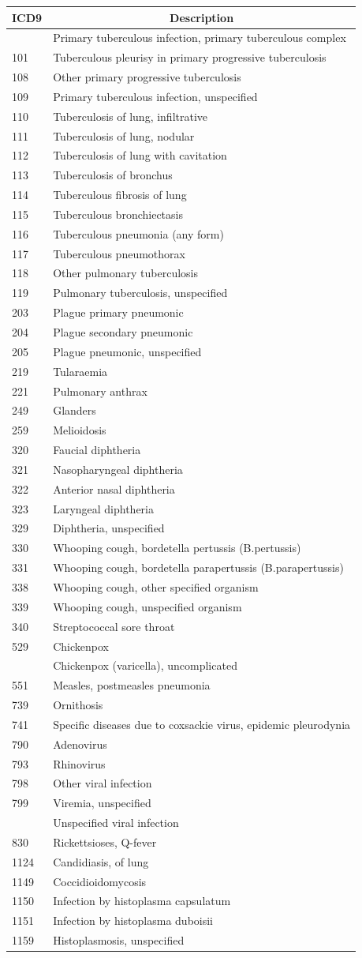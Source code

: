 \documentclass[]{article}\usepackage[]{graphicx}\usepackage[]{color}
\begin{document}
\setlongtables\begin{longtable}{ll}\hline\hline
\multicolumn{1}{c}{ICD9}&\multicolumn{1}{c}{Description}\tabularnewline
\hline
\endhead
\hline
\endfoot
100&Primary tuberculous infection, primary tuberculous complex\tabularnewline
101&Tuberculous pleurisy in primary progressive tuberculosis\tabularnewline
108&Other primary progressive tuberculosis\tabularnewline
109&Primary tuberculous infection, unspecified\tabularnewline
110&Tuberculosis of lung, infiltrative\tabularnewline
111&Tuberculosis of lung, nodular\tabularnewline
112&Tuberculosis of lung with cavitation\tabularnewline
113&Tuberculosis of bronchus\tabularnewline
114&Tuberculous fibrosis of lung\tabularnewline
115&Tuberculous bronchiectasis\tabularnewline
116&Tuberculous pneumonia (any form)\tabularnewline
117&Tuberculous pneumothorax\tabularnewline
118&Other pulmonary tuberculosis\tabularnewline
119&Pulmonary tuberculosis, unspecified\tabularnewline
203&Plague primary pneumonic\tabularnewline
204&Plague secondary pneumonic\tabularnewline
205&Plague pneumonic, unspecified\tabularnewline
219&Tularaemia\tabularnewline
221&Pulmonary anthrax\tabularnewline
249&Glanders\tabularnewline
259&Melioidosis\tabularnewline
320&Faucial diphtheria\tabularnewline
321&Nasopharyngeal diphtheria\tabularnewline
322&Anterior nasal diphtheria\tabularnewline
323&Laryngeal diphtheria\tabularnewline
329&Diphtheria, unspecified\tabularnewline
330&Whooping cough, bordetella pertussis (B.pertussis)\tabularnewline
331&Whooping cough, bordetella parapertussis (B.parapertussis)\tabularnewline
338&Whooping cough, other specified organism\tabularnewline
339&Whooping cough, unspecified organism\tabularnewline
340&Streptococcal sore throat\tabularnewline
529&Chickenpox\tabularnewline
&Chickenpox (varicella), uncomplicated\tabularnewline
551&Measles, postmeasles pneumonia\tabularnewline
739&Ornithosis\tabularnewline
741&Specific diseases due to coxsackie virus, epidemic pleurodynia\tabularnewline
790&Adenovirus\tabularnewline
793&Rhinovirus\tabularnewline
798&Other viral infection\tabularnewline
799&Viremia, unspecified\tabularnewline
\newpage
&Unspecified viral infection\tabularnewline
830&Rickettsioses, Q-fever\tabularnewline
1124&Candidiasis, of lung\tabularnewline
1149&Coccidioidomycosis\tabularnewline
1150&Infection by histoplasma capsulatum\tabularnewline
1151&Infection by histoplasma duboisii\tabularnewline
1159&Histoplasmosis, unspecified\tabularnewline

\end{longtable}
\end{document}
